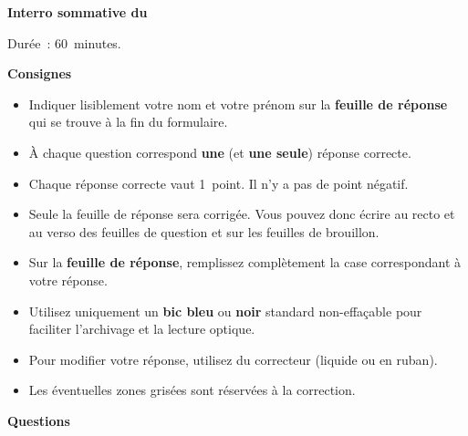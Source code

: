 \documentclass[12pt,french,a4paper,oneside]{article}
\newcommand{\thesubtitle}{Interro sommative du \thedate{}}
\begin{document}
\begin{examcopy}[2]
	\setcounter{figure}{0}
	{\bf \thetitle{} \hfill{} \thesubtitle{}}

	Durée~: 60~minutes.

	\vspace{1em}

	\begin{center}
	\end{center}

	\vspace{1em}

	\textbf{\Large{}Consignes}

	\begin{itemize}
		\item Indiquer lisiblement votre nom et votre prénom sur la \textbf{feuille de réponse} qui se trouve à la fin du formulaire.
		\item À chaque question correspond \textbf{une} (et \textbf{une seule}) réponse correcte.
		\item Chaque réponse correcte vaut 1~point. Il n'y a pas de point négatif.
		\item Seule la feuille de réponse sera corrigée.
		      Vous pouvez donc écrire au recto et au verso des feuilles de question et sur les feuilles de brouillon.
		\item Sur la \textbf{feuille de réponse}, remplissez complètement la case correspondant à votre réponse.
		\item Utilisez uniquement un \textbf{bic bleu} ou \textbf{noir} standard non-effaçable pour faciliter l'archivage et la lecture optique.
		\item Pour modifier votre réponse, utilisez du correcteur (liquide ou en ruban).
		\item Les éventuelles zones grisées sont réservées à la correction.
	\end{itemize}

	\vfill{}

	\begin{center}
	\end{center}

	\clearpage{}


	\textbf{\Large{}Questions}

	\vspace{1em}


\end{examcopy}
\end{document}
